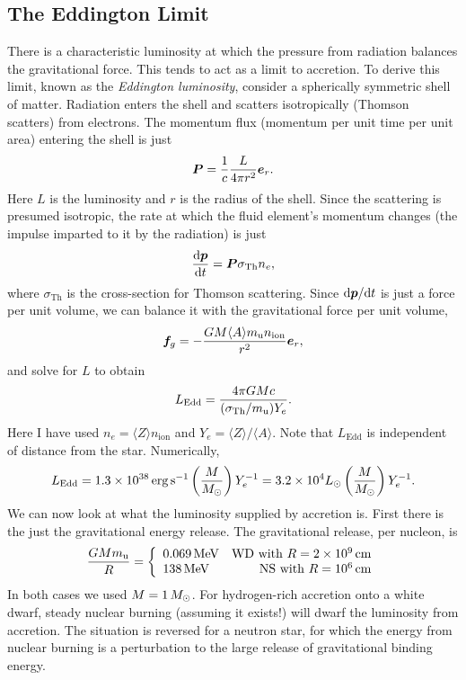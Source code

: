 \subsection{The Eddington Limit}

There is a characteristic luminosity at which the pressure from radiation balances the gravitational force.  This tends to act as a limit to accretion.  To derive this limit, known as the \emph{Eddington luminosity}, consider a spherically symmetric shell of matter.  Radiation enters the shell and scatters isotropically (Thomson scatters) from electrons.  The momentum flux (momentum per unit time per unit area) entering the shell is just
\[
	\boldsymbol{P} = \frac{1}{c}\frac{L}{4\pi r^{2}} \boldsymbol{e}_{r}.
\]
Here $L$ is the luminosity and $r$ is the radius of the shell.  Since the scattering is presumed isotropic, the rate at which the fluid element's momentum changes (the impulse imparted to it by the radiation) is just
\[
	\frac{\mathrm{d} \boldsymbol{p}}{\mathrm{d} t} = \boldsymbol{P}\sigma_{\mathrm{Th}} n_{e},
\]
where $\sigma_{\mathrm{Th}}$ is the cross-section for Thomson scattering.  Since $\mathrm{d}\boldsymbol{p}/\mathrm{d} t$ is just a force per unit volume, we can balance it with the gravitational force per unit volume,
\[
\boldsymbol{f}_{g} = -\frac{GM \langle A\rangle m_\mathrm{u} n_{\mathrm{ion}}}{r^{2}}\boldsymbol{e}_{r},
\]
and solve for $L$ to obtain
\begin{equation}\label{e.Ledd}
L_{\mathrm{Edd}} = \frac{4\pi GM c}{(\sigma_{\mathrm{Th}}/m_\mathrm{u})Y_{e}}.
\end{equation}
Here I have used $n_{e} = \langle Z\rangle n_{\mathrm{ion}}$ and $Y_{e} = \langle Z\rangle/\langle A\rangle$.
Note that $L_{\mathrm{Edd}}$ is independent of distance from the star.  Numerically,
\[ L_{\mathrm{Edd}} = 1.3\times 10^{38}\,\mathrm{erg}\,{\mathrm{s}}^{-1} \left(\frac{M}{M_\odot}\right)Y_{e}^{-1} 
	= 3.2\times 10^{4}L_{\odot} \left(\frac{M}{M_\odot}\right) Y_{e}^{-1}.
\]
We can now look at what the luminosity supplied by accretion is.  First there is the just the gravitational energy release.  The gravitational release, per nucleon, is
\[ \frac{GMm_\mathrm{u}}{R} =  \left\{\begin{array}{lr}0.069\,\mathrm{M}\mathrm{eV} & \textrm{WD with $R=2\times 10^{9}\,\mathrm{c}\mathrm{m}$}
	 \\ 138\,\mathrm{M}\mathrm{eV} & \textrm{NS with $R = 10^{6}\,\mathrm{c}\mathrm{m}$}\end{array}\right.
\]
In both cases we used $M = 1\,M_\odot$.  For hydrogen-rich accretion onto a white dwarf, steady nuclear burning (assuming it exists!) will dwarf the luminosity from accretion. The situation is reversed for a neutron star, for which the energy from nuclear burning is a perturbation to the large release of gravitational binding energy.

